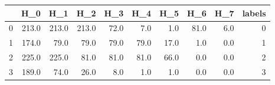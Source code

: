 \begin{tabular}{lrrrrrrrrr}
\toprule
{} &    H\_0 &    H\_1 &    H\_2 &   H\_3 &   H\_4 &   H\_5 &   H\_6 &  H\_7 &  labels \\
\midrule
0 &  213.0 &  213.0 &  213.0 &  72.0 &   7.0 &   1.0 &  81.0 &  6.0 &       0 \\
1 &  174.0 &   79.0 &   79.0 &  79.0 &  79.0 &  17.0 &   1.0 &  0.0 &       1 \\
2 &  225.0 &  225.0 &   81.0 &  81.0 &  81.0 &  66.0 &   0.0 &  0.0 &       2 \\
3 &  189.0 &   74.0 &   26.0 &   8.0 &   1.0 &   1.0 &   0.0 &  0.0 &       3 \\
\bottomrule
\end{tabular}
